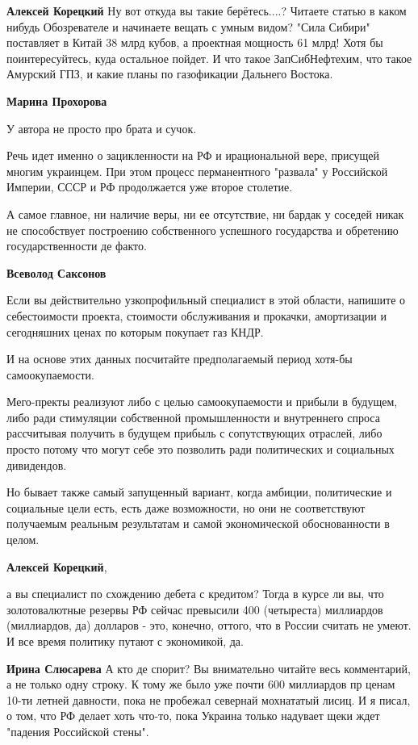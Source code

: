 \begin{itemize}
\begin{itemize}
\textbf{Алексей Корецкий}
Ну вот откуда вы такие берётесь....?
Читаете статью в каком нибудь Обозревателе и начинаете вещать с умным видом?
"Сила Сибири" поставляет в Китай 38 млрд кубов, а проектная мощность 61 млрд! Хотя бы поинтересуйтесь, куда остальное пойдет. И что такое
ЗапСибНефтехим,
что такое Амурский ГПЗ, и какие планы по газофикации Дальнего Востока.

\textbf{Марина Прохорова}

У автора не просто про брата и сучок.

Речь идет именно о зацикленности на РФ и ирациональной вере, присущей многим
украинцем. При этом процесс перманентного "развала" у Российской Империи, СССР
и РФ продолжается уже второе столетие.

А самое главное, ни наличие веры, ни ее отсутствие, ни бардак у соседей никак
не способствует построению собственного успешного государства и обретению
государственности де факто.

\textbf{Всеволод Саксонов}

Если вы действительно узкопрофильный специалист в этой области, напишите о
себестоимости проекта, стоимости обслуживания и прокачки, амортизации и
сегодняшних ценах по которым покупает газ КНДР.

И на основе этих данных посчитайте предполагаемый период хотя-бы
самоокупаемости.

Мего-пректы реализуют либо с целью самоокупаемости и прибыли в будущем, либо
ради стимуляции собственной промышленности и внутреннего спроса рассчитывая
получить в будущем прибыль с сопутствующих отраслей, либо просто потому что
могут себе это позволить ради политических и социальных дивидендов.

Но бывает также самый запущенный вариант, когда амбиции, политические и
социальные цели есть, есть даже возможности, но они не соответствуют получаемым
реальным результатам и самой экономической обоснованности в целом.

\textbf{Алексей Корецкий}, 

а вы специалист по схождению дебета с кредитом? Тогда в курсе ли вы, что
золотовалютные резервы РФ сейчас превысили 400 (четыреста) миллиардов
(миллиардов, да) долларов - это, конечно, оттого, что в России считать не
умеют. И все время политику путают с экономикой, да.


\textbf{Ирина Слюсарева}
А кто де спорит?
Вы внимательно читайте весь комментарий, а не только одну строку.
К тому же было уже почти 600 миллиардов пр ценам 10-ти летней давности, пока не пробежал севернай мохнататый лисиц.
И я писал, о том, что РФ делает хоть что-то, пока Украина только надувает щеки ждет "падения Российской стены".



\end{itemize}
\end{itemize}
